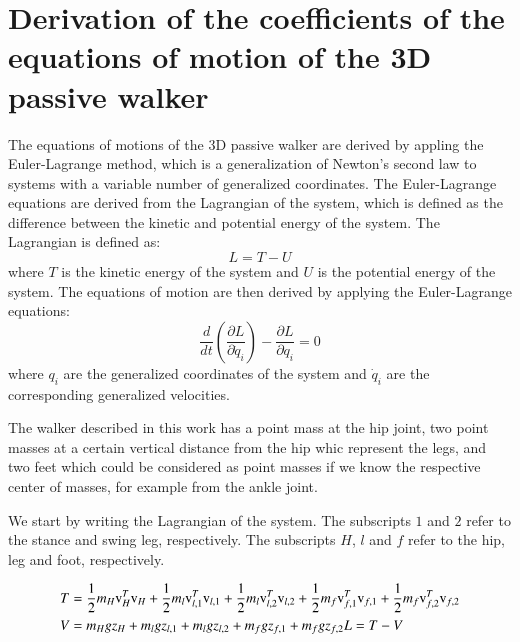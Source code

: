\section{Derivation of the coefficients of the equations of motion of the 3D passive walker}
\label{sec:appendix_a}

The equations of motions of the 3D passive walker are derived by appling the Euler-Lagrange method, which is a generalization of Newton's second law to systems with a variable number of generalized coordinates.
The Euler-Lagrange equations are derived from the Lagrangian of the system, which is defined as the difference between the kinetic and potential energy of the system.
The Lagrangian is defined as:
\begin{equation}\label{eq:lagrangian}
    L = T - U
\end{equation}
where $T$ is the kinetic energy of the system and $U$ is the potential energy of the system.
The equations of motion are then derived by applying the Euler-Lagrange equations:
\begin{equation}\label{eq:euler_lagrange}
    \frac{d}{dt}\left(\frac{\partial L}{\partial \dot{q}_i}\right) - \frac{\partial L}{\partial q_i} = 0
\end{equation}
where $q_i$ are the generalized coordinates of the system and $\dot{q}_i$ are the corresponding generalized velocities.

The walker described in this work has a point mass at the hip joint, two point masses at a certain vertical distance from the hip whic represent the legs, and two feet which could be considered as point masses if we know the respective center of masses, for example from the ankle joint.

We start by writing the Lagrangian of the system. The subscripts $1$ and $2$ refer to the stance and swing leg, respectively. The subscripts $H$, $l$ and $f$ refer to the hip, leg and foot, respectively.

\begin{equation}
    \begin{split}
        T &= \frac{1}{2} m_H \text{v}_H^T \text{v}_H + \frac{1}{2} m_l \text{v}_{l,1}^T \text{v}_{l,1} + \frac{1}{2} m_l \text{v}_{l,2}^T \text{v}_{l,2} + \frac{1}{2} m_f \text{v}_{f,1}^T \text{v}_{f,1} + \frac{1}{2} m_f \text{v}_{f,2}^T \text{v}_{f,2} \\
        V &= m_H g z_H + m_l g z_{l,1} + m_l g z_{l,2} + m_f g z_{f,1} + m_f g z_{f,2}
        L = T - V
    \end{split}
\end{equation}

